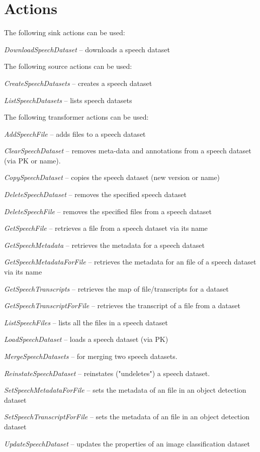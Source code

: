 \documentclass[a4paper]{book}
\begin{document}
\section{Actions}
The following sink actions can be used:
\begin{tight_itemize}
  \item \textit{DownloadSpeechDataset} -- downloads a speech dataset
\end{tight_itemize}
The following source actions can be used:
\begin{tight_itemize}
  \item \textit{CreateSpeechDatasets} -- creates a speech dataset
  \item \textit{ListSpeechDatasets} -- lists speech datasets
\end{tight_itemize}
The following transformer actions can be used:
\begin{tight_itemize}
  \item \textit{AddSpeechFile} -- adds files to a speech dataset
  \item \textit{ClearSpeechDataset} -- removes meta-data and annotations from a speech dataset (via PK or name).
  \item \textit{CopySpeechDataset} -- copies the speech dataset (new version or name)
  \item \textit{DeleteSpeechDataset} -- removes the specified speech dataset
  \item \textit{DeleteSpeechFile} -- removes the specified files from a speech dataset
  \item \textit{GetSpeechFile} -- retrieves a file from a speech dataset via its name
  \item \textit{GetSpeechMetadata} -- retrieves the metadata for a speech dataset
  \item \textit{GetSpeechMetadataForFile} -- retrieves the metadata for an file of a speech dataset via its name
  \item \textit{GetSpeechTranscripts} -- retrieves the map of file/transcripts for a dataset
  \item \textit{GetSpeechTranscriptForFile} -- retrieves the transcript of a file from a dataset
  \item \textit{ListSpeechFiles} -- lists all the files in a speech dataset
  \item \textit{LoadSpeechDataset} -- loads a speech dataset (via PK)
  \item \textit{MergeSpeechDatasets} -- for merging two speech datasets.
  \item \textit{ReinstateSpeechDataset} -- reinstates ("undeletes") a speech dataset.
  \item \textit{SetSpeechMetadataForFile} -- sets the metadata of an file in an object detection dataset
  \item \textit{SetSpeechTranscriptForFile} -- sets the metadata of an file in an object detection dataset
  \item \textit{UpdateSpeechDataset} -- updates the properties of an image classification dataset
\end{tight_itemize}
\end{document}
